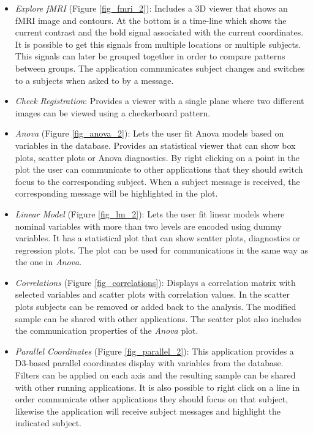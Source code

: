 \begin{itemize}
\item \emph{Explore fMRI} (Figure \ref{fig_fmri_2}): Includes a 3D viewer that shows an fMRI image and contours. At the bottom is a time-line which shows the current contrast and the bold signal associated with the current coordinates. It is possible to get this signals from multiple locations or multiple subjects. This signals can later be grouped together in order to compare patterns between groups. The application communicates subject changes and switches to a subjects when asked to by a message.

\item \emph{Check Registration}: Provides a viewer with a single plane where two different images can be viewed using a checkerboard pattern. 

\item \emph{Anova} (Figure \ref{fig_anova_2}): Lets the user fit Anova models based on variables in the database. Provides an statistical viewer that can show box plots, scatter plots or Anova diagnostics. By right clicking on a point in the plot the user can communicate to other applications that they should switch focus to the corresponding subject. When a subject message is received, the corresponding message will be highlighted in the plot.

\item \emph{Linear Model} (Figure \ref{fig_lm_2}): Lets the user fit linear models where nominal variables with more than two levels are encoded using dummy variables. It has a statistical plot that can show scatter plots, diagnostics or regression plots. The plot can be used for communications in the same way as the one in \emph{Anova}.

\item \emph{Correlations} (Figure \ref{fig_correlations}): Displays a correlation matrix with selected variables and scatter plots with correlation values. In the scatter plots subjects can be removed or added back to the analysis. The modified sample can be shared with other applications. The scatter plot also includes the communication properties of the \emph{Anova} plot.

\item \emph{Parallel Coordinates} (Figure \ref{fig_parallel_2}): This application provides a D3-based parallel coordinates display with variables from the database. Filters can be applied on each axis and the resulting sample can be shared with other running applications. It is also possible to right click on a line in order communicate other applications they should focus on that subject, likewise the application will receive subject messages and highlight the indicated subject.

\end{itemize}

